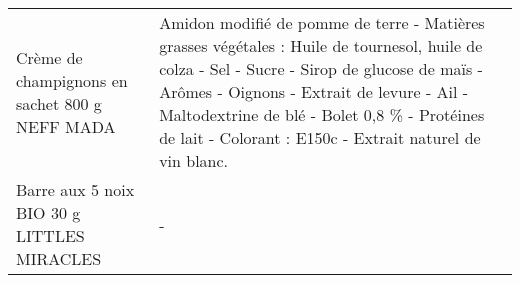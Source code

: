 \begin{longtable}{p{5cm}p{10cm}}
                                                           Crème de champignons en sachet 800 g NEFF MADA &                                                                                                                                                                                                                                                                                                                                                                                                                                                                                                                                                                                                                                                                                                                                     Amidon modifié de pomme de terre - Matières grasses végétales : Huile de tournesol, huile de colza - Sel - Sucre - Sirop de glucose de maïs - Arômes - Oignons - Extrait de levure - Ail - Maltodextrine de blé - Bolet 0,8 \% - Protéines de lait - Colorant : E150c - Extrait naturel de vin blanc. \\
                                                               Barre aux 5 noix BIO 30 g LITTLES MIRACLES &                                                                                                                                                                                                                                                                                                                                                                                                                                                                                                                                                                                                                                                                                                                                                                                                                                                                                                                                                                                                                                        - \\

\end{longtable}
